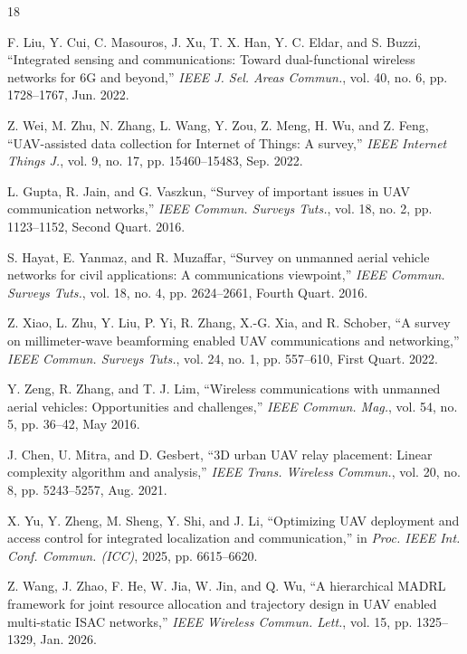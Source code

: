 \documentclass[10pt,journal,letterpaper]{IEEEtran}
\begin{document}
\balance

\begin{thebibliography}{18}

F. Liu, Y. Cui, C. Masouros, J. Xu, T. X. Han, Y. C. Eldar, and S. Buzzi, ``Integrated sensing and communications: Toward dual-functional wireless networks for 6G and beyond,'' \emph{IEEE J. Sel. Areas Commun.}, vol. 40, no. 6, pp. 1728--1767, Jun. 2022.

Z. Wei, M. Zhu, N. Zhang, L. Wang, Y. Zou, Z. Meng, H. Wu, and Z. Feng, ``UAV-assisted data collection for Internet of Things: A survey,'' \emph{IEEE Internet Things J.}, vol. 9, no. 17, pp. 15460--15483, Sep. 2022.

L. Gupta, R. Jain, and G. Vaszkun, ``Survey of important issues in UAV communication networks,'' \emph{IEEE Commun. Surveys Tuts.}, vol. 18, no. 2, pp. 1123--1152, Second Quart. 2016.

S. Hayat, E. Yanmaz, and R. Muzaffar, ``Survey on unmanned aerial vehicle networks for civil applications: A communications viewpoint,'' \emph{IEEE Commun. Surveys Tuts.}, vol. 18, no. 4, pp. 2624--2661, Fourth Quart. 2016.

Z. Xiao, L. Zhu, Y. Liu, P. Yi, R. Zhang, X.-G. Xia, and R. Schober, ``A survey on millimeter-wave beamforming enabled UAV communications and networking,'' \emph{IEEE Commun. Surveys Tuts.}, vol. 24, no. 1, pp. 557--610, First Quart. 2022.

Y. Zeng, R. Zhang, and T. J. Lim, ``Wireless communications with unmanned aerial vehicles: Opportunities and challenges,'' \emph{IEEE Commun. Mag.}, vol. 54, no. 5, pp. 36--42, May 2016.

J. Chen, U. Mitra, and D. Gesbert, ``3D urban UAV relay placement: Linear complexity algorithm and analysis,'' \emph{IEEE Trans. Wireless Commun.}, vol. 20, no. 8, pp. 5243--5257, Aug. 2021.

X. Yu, Y. Zheng, M. Sheng, Y. Shi, and J. Li, ``Optimizing UAV deployment and access control for integrated localization and communication,'' in \emph{Proc. IEEE Int. Conf. Commun. (ICC)}, 2025, pp. 6615--6620.

Z. Wang, J. Zhao, F. He, W. Jia, W. Jin, and Q. Wu, ``A hierarchical MADRL framework for joint resource allocation and trajectory design in UAV enabled multi-static ISAC networks,'' \emph{IEEE Wireless Commun. Lett.}, vol. 15, pp. 1325--1329, Jan. 2026.


\end{thebibliography}
\end{document}
